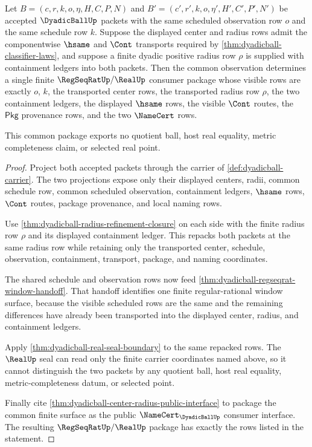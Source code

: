 \begin{theorem}
\label{thm:dyadicball-common-observation-overlap}
Let
$B=(c,r,k,o,\eta,H,C,P,N)$ and
$B'=(c',r',k,o,\eta',H',C',P',N')$ be accepted
$\DyadicBallUp$ packets with the same scheduled observation row $o$ and the
same schedule row $k$. Suppose the displayed center and radius rows admit the
componentwise $\hsame$ and $\Cont$ transports required by
\autoref{thm:dyadicball-classifier-laws}, and suppose a finite dyadic positive
radius row $\rho$ is supplied with containment ledgers into both packets. Then
the common observation determines a single finite $\RegSeqRatUp/\RealUp$
consumer package whose visible rows are exactly $o$, $k$, the transported
center rows, the transported radius row $\rho$, the two containment ledgers,
the displayed $\hsame$ rows, the visible $\Cont$ routes, the $\mathsf{Pkg}$
provenance rows, and the two $\NameCert$ rows.

This common package exports no quotient ball, host real equality, metric
completeness claim, or selected real point.
\end{theorem}
\begin{proof}
Project both accepted packets through the carrier of
\autoref{def:dyadicball-carrier}. The two projections expose only their
displayed centers, radii, common schedule row, common scheduled observation,
containment ledgers, $\hsame$ rows, $\Cont$ routes, package provenance, and
local naming rows.

Use \autoref{thm:dyadicball-radius-refinement-closure} on each side with the
finite radius row $\rho$ and its displayed containment ledger. This repacks
both packets at the same radius row while retaining only the transported
center, schedule, observation, containment, transport, package, and naming
coordinates.

The shared schedule and observation rows now feed
\autoref{thm:dyadicball-regseqrat-window-handoff}. That handoff identifies one
finite regular-rational window surface, because the visible scheduled rows are
the same and the remaining differences have already been transported into the
displayed center, radius, and containment ledgers.

Apply \autoref{thm:dyadicball-real-seal-boundary} to the same repacked rows.
The $\RealUp$ seal can read only the finite carrier coordinates named above, so
it cannot distinguish the two packets by any quotient ball, host real equality,
metric-completeness datum, or selected point.

Finally cite \autoref{thm:dyadicball-center-radius-public-interface} to package
the common finite surface as the public $\NameCert_{\DyadicBallUp}$ consumer
interface. The resulting $\RegSeqRatUp/\RealUp$ package has exactly the rows
listed in the statement.
\end{proof}

